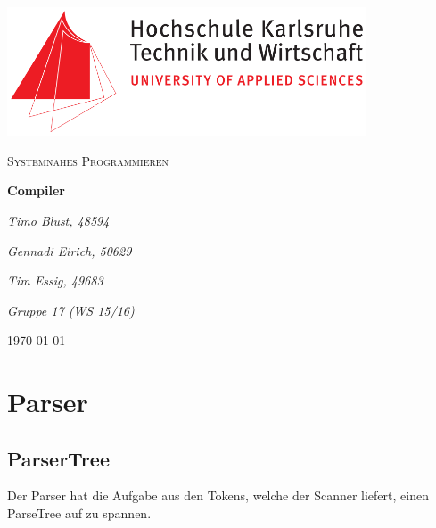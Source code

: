 \documentclass[
a4paper
]{scrreprt}
\begin{document}
	\sffamily %
	
	
	\begin{titlepage}
		\centering
		\includegraphics[width=0.8\textwidth]{./images/logo_hska.png}\par\vspace{1cm}
		\vspace{1cm}
		
		{\scshape\Large Systemnahes Programmieren\par}
		\vspace{1.5cm}
		
		{\huge\textbf{Compiler}\par}
		\vspace{2cm}
		
		{\Large\itshape Timo Blust, 48594\par}
		{\Large\itshape Gennadi Eirich, 50629\par}
		{\Large\itshape Tim Essig, 49683\par\par}
		\vspace{2cm}
		
		{\Large\itshape Gruppe 17 (WS 15/16)\par}
		
		\vfill
		
		{\large \today\par}
	\end{titlepage}
	
	
	\tableofcontents
	
	\chapter{Parser}
	\section{ParserTree}
		Der Parser hat die Aufgabe aus den Tokens, welche der Scanner liefert, einen ParseTree auf zu spannen. \\
\end{document}
